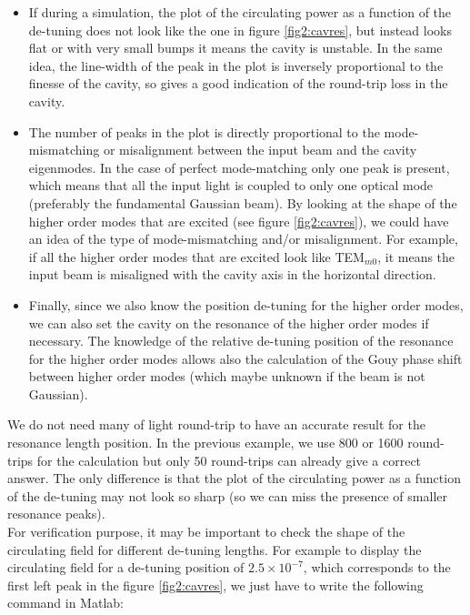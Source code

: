 \begin{itemize}
  \item If during a simulation, the plot of the circulating power as a function of the de-tuning does not look like the one in figure \ref{fig2:cavres}, but instead looks flat or with very small bumps it means the cavity is unstable. In the same idea, the line-width of the peak in the plot is inversely proportional to the finesse of the cavity, so gives a good indication of the round-trip loss in the cavity.
  \item The number of peaks in the plot is directly proportional to the mode-mismatching or misalignment between the input beam and the cavity eigenmodes. In the case of perfect mode-matching only one peak is present, which means that all the input light is coupled to only one optical mode (preferably the fundamental Gaussian beam). By looking at the shape of the higher order modes that are excited (see figure \ref{fig2:cavres}), we could have an idea of the type of mode-mismatching and/or misalignment. For example, if all the higher order modes that are excited look like TEM$_{m0}$, it means the input beam is misaligned with the cavity axis in the horizontal direction.
  \item Finally, since we also know the position de-tuning for the higher order modes, we can also set the cavity on the resonance of the higher order modes if necessary. The knowledge of the relative de-tuning position of the resonance for the higher order modes allows also the calculation of the Gouy phase shift between higher order modes (which maybe unknown if the beam is not Gaussian).\\
\end{itemize}

We do not need many of light round-trip to have an accurate result for the resonance length position. In the previous example, we use 800 or 1600 round-trips for the calculation but only 50 round-trips can already give a correct answer. The only difference is that the plot of the circulating power as a function of the de-tuning may not look so sharp (so we can miss the presence of smaller resonance peaks).\\

For verification purpose, it may be important to check the shape of the circulating field for different de-tuning lengths. For example to display the circulating field for a de-tuning position of $2.5 \times 10^{-7}$, which corresponds to the first left peak in the figure \ref{fig2:cavres}, we just have to write the following command in Matlab:

